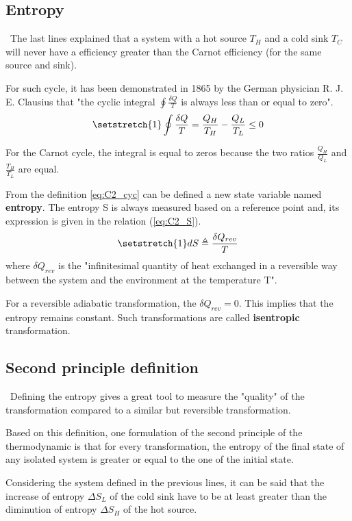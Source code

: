 \subsection{Entropy}
\quad\, The last lines explained that a system with a hot source $T_H$ and a cold sink $T_C$ will never have a efficiency greater than the Carnot efficiency (for the same source and sink).

For such cycle, it has been demonstrated in 1865 by the German physician R. J. E. Clausius that "the cyclic integral $\oint\frac{\delta Q}{T}$ is always less than or equal to zero"\cite{2015}.
\begin{equation}
\setstretch{1}
\oint\frac{\delta Q}{T} = \frac{Q_H}{T_H} - \frac{Q_L}{T_L}\leq 0\label{eq:C2_cyc}
\end{equation}

For the Carnot cycle, the integral is equal to zeros because the two ratios $\frac{Q_H}{Q_L}$ and $\frac{T_H}{T_L}$ are equal.

From the definition \ref{eq:C2_cyc} can be defined a new state variable named \textbf{entropy}. The entropy S is always measured based on a reference point and, its expression is given in the relation (\ref{eq:C2_S}).
\begin{equation}
\setstretch{1}
dS \triangleq \frac{\delta Q_{rev}}{T}\label{eq:C2_S}
\end{equation}
where $\delta Q_{rev}$ is the "infinitesimal quantity of heat exchanged in a reversible way between the system and the environment at the temperature T"\cite{Dewallef2019}. 

For a reversible adiabatic transformation, the $\delta Q_{rev}=0$. This implies that the entropy remains constant. Such transformations are called \textbf{isentropic} transformation.

\subsection{Second principle definition}
\quad\, Defining the entropy gives a great tool to measure the "quality" of the transformation compared to a similar but reversible transformation.

Based on this definition, one formulation of the second principle of the thermodynamic is that for every transformation, the entropy of the final state of any isolated system is greater or equal to the one of the initial state.

Considering the system defined in the previous lines, it can be said that the increase of entropy $\Delta S_L$ of the cold sink have to be at least greater than the diminution of entropy $\Delta S_H$ of the hot source.

